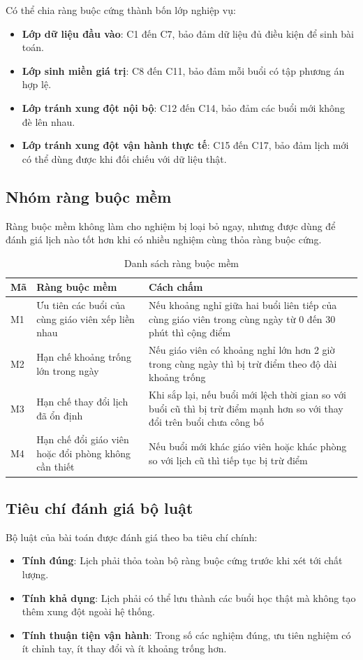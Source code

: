 \documentclass[../DoAn.tex]{subfiles}
\begin{document}
Có thể chia ràng buộc cứng thành bốn lớp nghiệp vụ:
\begin{itemize}
    \item \textbf{Lớp dữ liệu đầu vào}: C1 đến C7, bảo đảm dữ liệu đủ điều kiện để sinh bài toán.
    \item \textbf{Lớp sinh miền giá trị}: C8 đến C11, bảo đảm mỗi buổi có tập phương án hợp lệ.
    \item \textbf{Lớp tránh xung đột nội bộ}: C12 đến C14, bảo đảm các buổi mới không đè lên nhau.
    \item \textbf{Lớp tránh xung đột vận hành thực tế}: C15 đến C17, bảo đảm lịch mới có thể dùng được khi đối chiếu với dữ liệu thật.
\end{itemize}

\subsection{Nhóm ràng buộc mềm}
Ràng buộc mềm không làm cho nghiệm bị loại bỏ ngay, nhưng được dùng để đánh giá lịch nào tốt hơn khi có nhiều nghiệm cùng thỏa ràng buộc cứng.

\begin{table}[H]
\centering
\caption{Danh sách ràng buộc mềm}
\label{table:bang5.3}
\scriptsize
\begin{tabular}{|l|p{4.5cm}|p{6cm}|}
\hline
\textbf{Mã} & \textbf{Ràng buộc mềm} & \textbf{Cách chấm} \\ \hline
M1 & Ưu tiên các buổi của cùng giáo viên xếp liền nhau & Nếu khoảng nghỉ giữa hai buổi liên tiếp của cùng giáo viên trong cùng ngày từ 0 đến 30 phút thì cộng điểm \\ \hline
M2 & Hạn chế khoảng trống lớn trong ngày & Nếu giáo viên có khoảng nghỉ lớn hơn 2 giờ trong cùng ngày thì bị trừ điểm theo độ dài khoảng trống \\ \hline
M3 & Hạn chế thay đổi lịch đã ổn định & Khi sắp lại, nếu buổi mới lệch thời gian so với buổi cũ thì bị trừ điểm mạnh hơn so với thay đổi trên buổi chưa công bố \\ \hline
M4 & Hạn chế đổi giáo viên hoặc đổi phòng không cần thiết & Nếu buổi mới khác giáo viên hoặc khác phòng so với lịch cũ thì tiếp tục bị trừ điểm \\ \hline
\end{tabular}
\end{table}

\subsection{Tiêu chí đánh giá bộ luật}
Bộ luật của bài toán được đánh giá theo ba tiêu chí chính:
\begin{itemize}
    \item \textbf{Tính đúng}: Lịch phải thỏa toàn bộ ràng buộc cứng trước khi xét tới chất lượng.
    \item \textbf{Tính khả dụng}: Lịch phải có thể lưu thành các buổi học thật mà không tạo thêm xung đột ngoài hệ thống.
    \item \textbf{Tính thuận tiện vận hành}: Trong số các nghiệm đúng, ưu tiên nghiệm có ít chỉnh tay, ít thay đổi và ít khoảng trống hơn.
\end{itemize}
\end{document}
